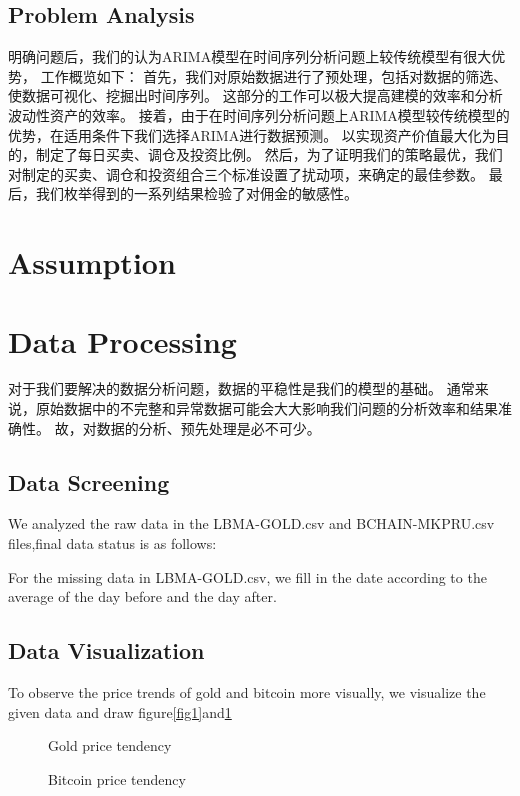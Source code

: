 \documentclass{mcmthesis}
\begin{document}
\subsection{Problem Analysis}

明确问题后，我们的认为ARIMA模型在时间序列分析问题上较传统模型有很大优势，
工作概览如下：
首先，我们对原始数据进行了预处理，包括对数据的筛选、使数据可视化、挖掘出时间序列。
这部分的工作可以极大提高建模的效率和分析波动性资产的效率。
接着，由于在时间序列分析问题上ARIMA模型较传统模型的优势，在适用条件下我们选择ARIMA进行数据预测。
以实现资产价值最大化为目的，制定了每日买卖、调仓及投资比例。
然后，为了证明我们的策略最优，我们对制定的买卖、调仓和投资组合三个标准设置了扰动项，来确定的最佳参数。
最后，我们枚举得到的一系列结果检验了对佣金的敏感性。



\section{Assumption}





\section{Data Processing}
对于我们要解决的数据分析问题，数据的平稳性是我们的模型的基础。
通常来说，原始数据中的不完整和异常数据可能会大大影响我们问题的分析效率和结果准确性。
故，对数据的分析、预先处理是必不可少。


\subsection{Data Screening}
We analyzed the raw data in the LBMA-GOLD.csv and BCHAIN-MKPRU.csv files,final data status is as follows:


For the missing data in LBMA-GOLD.csv, we fill in the date according to the average of the day before and the day after.


\subsection{Data Visualization}
To observe the price trends of gold and bitcoin more visually,
we visualize the given data and draw figure\ref{fig1}and\ref{fig2}
\begin{figure}[h]
  \centering
  \caption{Gold price tendency} \label{fig1}
  \centering
  \caption{Bitcoin price tendency} \label{fig2}
  \end{figure}
\end{document}
